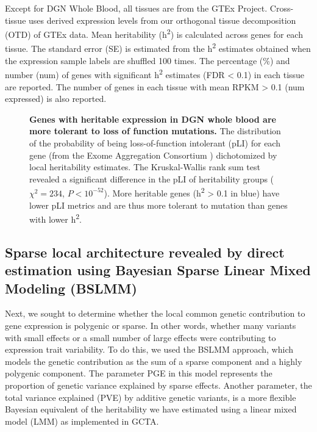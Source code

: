 \documentclass[10pt,letterpaper]{article}
\begin{document}
\begin{table}[!ht]
\begin{adjustwidth}{-2.25in}{0in}
\begin{tabular}{lrlrrr}
\end{tabular}
\begin{flushleft} Except for DGN Whole Blood, all tissues are from the GTEx Project. Cross-tissue uses derived expression levels from our orthogonal tissue decomposition (OTD) of GTEx data. Mean heritability (h\textsuperscript{2}) is calculated across genes for each tissue. The standard error (SE) is estimated from the h\textsuperscript{2} estimates obtained when the expression sample labels are shuffled 100 times. The percentage (\%) and number (num) of genes with significant h\textsuperscript{2} estimates (FDR \textless{} 0.1) in each tissue are reported. The number of genes in each tissue with mean RPKM \textgreater{} 0.1 (num expressed) is also reported.
\end{flushleft}
\label{table-h2}
\end{adjustwidth}
\end{table}



\begin{figure}[H]
\caption{{\bf Genes with heritable expression in DGN whole blood are more tolerant to loss of function mutations.} 
The distribution of the probability of being loss-of-function intolerant (pLI) for each gene (from the Exome Aggregation Consortium \cite{lek2016analysis}) dichotomized by local heritability estimates. The Kruskal-Wallis rank sum test revealed a significant difference in the pLI of heritability groups ($\chi^2 = 234$, $P < 10^{-52}$). More heritable genes (h\textsuperscript{2} \textgreater{} 0.1 in blue) have lower pLI metrics and are thus more tolerant to mutation than genes with lower h\textsuperscript{2}.
}
\label{fig-pli-h2}
\end{figure}


\subsection*{Sparse local architecture revealed by direct estimation using Bayesian Sparse Linear Mixed Modeling (BSLMM)}

Next, we sought to determine whether the local common genetic contribution to gene expression is polygenic or sparse. In other words, whether many variants with small effects or a small number of large effects were contributing to expression trait variability. To do this, we used the BSLMM \cite{Zhou_2013} approach, which models the genetic contribution as the sum of a sparse component and a highly polygenic component. The parameter PGE in this model represents the proportion of genetic variance explained by sparse effects. Another parameter, the total variance explained (PVE) by additive genetic variants, is a more flexible Bayesian equivalent of the heritability we have estimated using a linear mixed model (LMM) as implemented in GCTA. 
\end{document}
